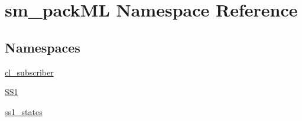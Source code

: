 \hypertarget{namespacesm__packML}{}\section{sm\+\_\+pack\+ML Namespace Reference}
\label{namespacesm__packML}
\subsection*{Namespaces}
\begin{DoxyCompactItemize}
\item 
 \hyperlink{namespacesm__packML_1_1cl__subscriber}{cl\+\_\+subscriber}
\item 
 \hyperlink{namespacesm__packML_1_1SS1}{S\+S1}
\item 
 \hyperlink{namespacesm__packML_1_1ss1__states}{ss1\+\_\+states}
\end{DoxyCompactItemize}
